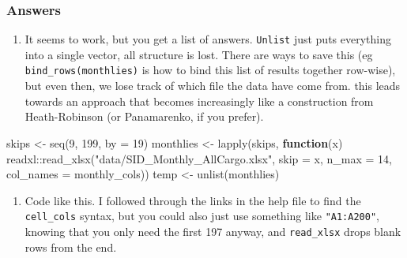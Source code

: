 \documentclass[
]{book}
\newenvironment{Shaded}{\begin{snugshade}}{\end{snugshade}}
\newcommand{\AttributeTok}[1]{\textcolor[rgb]{0.77,0.63,0.00}{#1}}
\newcommand{\ControlFlowTok}[1]{\textcolor[rgb]{0.13,0.29,0.53}{\textbf{#1}}}
\newcommand{\DecValTok}[1]{\textcolor[rgb]{0.00,0.00,0.81}{#1}}
\newcommand{\FunctionTok}[1]{\textcolor[rgb]{0.00,0.00,0.00}{#1}}
\newcommand{\NormalTok}[1]{#1}
\newcommand{\OtherTok}[1]{\textcolor[rgb]{0.56,0.35,0.01}{#1}}
\newcommand{\SpecialCharTok}[1]{\textcolor[rgb]{0.00,0.00,0.00}{#1}}
\newcommand{\StringTok}[1]{\textcolor[rgb]{0.31,0.60,0.02}{#1}}
\providecommand{\tightlist}{%
  \setlength{\itemsep}{0pt}\setlength{\parskip}{0pt}}
\begin{document}
\hypertarget{answers-7}{%
\subsubsection{Answers}\label{answers-7}}

\begin{enumerate}
\def\labelenumi{\arabic{enumi})}
\tightlist
\item
  It seems to work, but you get a list of answers. \texttt{Unlist} just puts everything into a single vector, all structure is lost. There are ways to save this (eg \texttt{bind\_rows(monthlies)} is how to bind this list of results together row-wise), but even then, we lose track of which file the data have come from. this leads towards an approach that becomes increasingly like a construction from Heath-Robinson (or Panamarenko, if you prefer).
\end{enumerate}

\begin{Shaded}
\begin{Highlighting}[]
\NormalTok{skips }\OtherTok{\textless{}{-}} \FunctionTok{seq}\NormalTok{(}\DecValTok{9}\NormalTok{, }\DecValTok{199}\NormalTok{, }\AttributeTok{by =} \DecValTok{19}\NormalTok{)}
\NormalTok{monthlies }\OtherTok{\textless{}{-}} \FunctionTok{lapply}\NormalTok{(skips,}
                    \ControlFlowTok{function}\NormalTok{(x) readxl}\SpecialCharTok{::}\FunctionTok{read\_xlsx}\NormalTok{(}\StringTok{"data/SID\_Monthly\_AllCargo.xlsx"}\NormalTok{, }
                                      \AttributeTok{skip =}\NormalTok{ x, }\AttributeTok{n\_max =} \DecValTok{14}\NormalTok{, }
                                      \AttributeTok{col\_names =}\NormalTok{ monthly\_cols))}
\NormalTok{temp }\OtherTok{\textless{}{-}} \FunctionTok{unlist}\NormalTok{(monthlies)}
\end{Highlighting}
\end{Shaded}

\begin{enumerate}
\def\labelenumi{\arabic{enumi})}
\setcounter{enumi}{1}
\tightlist
\item
  Code like this. I followed through the links in the help file to find the \texttt{cell\_cols} syntax, but you could also just use something like \texttt{"A1:A200"}, knowing that you only need the first 197 anyway, and \texttt{read\_xlsx} drops blank rows from the end.
\end{enumerate}
\end{document}
